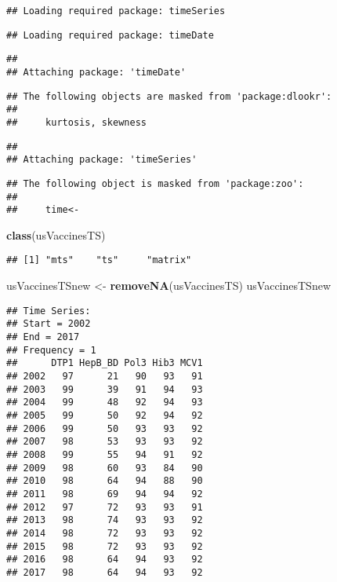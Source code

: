 \documentclass[]{article}
\newenvironment{Shaded}{\begin{snugshade}}{\end{snugshade}}
\newcommand{\KeywordTok}[1]{\textcolor[rgb]{0.13,0.29,0.53}{\textbf{#1}}}
\newcommand{\NormalTok}[1]{#1}
\newcommand{\StringTok}[1]{\textcolor[rgb]{0.31,0.60,0.02}{#1}}
\begin{document}
\begin{verbatim}
## Loading required package: timeSeries
\end{verbatim}

\begin{verbatim}
## Loading required package: timeDate
\end{verbatim}

\begin{verbatim}
## 
## Attaching package: 'timeDate'
\end{verbatim}

\begin{verbatim}
## The following objects are masked from 'package:dlookr':
## 
##     kurtosis, skewness
\end{verbatim}

\begin{verbatim}
## 
## Attaching package: 'timeSeries'
\end{verbatim}

\begin{verbatim}
## The following object is masked from 'package:zoo':
## 
##     time<-
\end{verbatim}

\begin{Shaded}
\begin{Highlighting}[]
\KeywordTok{class}\NormalTok{(usVaccinesTS)}
\end{Highlighting}
\end{Shaded}

\begin{verbatim}
## [1] "mts"    "ts"     "matrix"
\end{verbatim}

\begin{Shaded}
\begin{Highlighting}[]
\NormalTok{usVaccinesTSnew <-}\StringTok{ }\KeywordTok{removeNA}\NormalTok{(usVaccinesTS)}
\NormalTok{usVaccinesTSnew}
\end{Highlighting}
\end{Shaded}

\begin{verbatim}
## Time Series:
## Start = 2002 
## End = 2017 
## Frequency = 1 
##      DTP1 HepB_BD Pol3 Hib3 MCV1
## 2002   97      21   90   93   91
## 2003   99      39   91   94   93
## 2004   99      48   92   94   93
## 2005   99      50   92   94   92
## 2006   99      50   93   93   92
## 2007   98      53   93   93   92
## 2008   99      55   94   91   92
## 2009   98      60   93   84   90
## 2010   98      64   94   88   90
## 2011   98      69   94   94   92
## 2012   97      72   93   93   91
## 2013   98      74   93   93   92
## 2014   98      72   93   93   92
## 2015   98      72   93   93   92
## 2016   98      64   94   93   92
## 2017   98      64   94   93   92
\end{verbatim}
\end{document}

